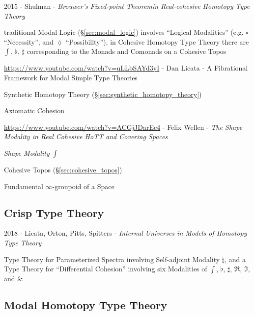 2015 - Shulman - \emph{Brouwer's Fixed-point Theoremin Real-cohesive Homotopy
  Type Theory}

traditional Modal Logic (\S\ref{sec:modal_logic}) involves ``Logical
Modalities'' (e.g. $\square$ ``Necessity'', and $\lozenge$ ``Possibility''), in
Cohesive Homotopy Type Theory there are $\int$, $\flat$, $\sharp$ corresponding
to the Monads and Comonads on a Cohesive Topos

\asterism

\url{https://www.youtube.com/watch?v=uLLbSAYd3yI} - Dan Licata - A Fibrational
Framework for Modal Simple Type Theories

\fist Synthetic Homotopy Theory (\S\ref{sec:synthetic_homotopy_theory})

Axiomatic Cohesion

\asterism

\url{https://www.youtube.com/watch?v=ACGjJDarEc4} - Felix Wellen - \emph{The
  Shape Modality in Real Cohesive HoTT and Covering Spaces}

\emph{Shape Modality} $\int$

Cohesive Topos (\S\ref{sec:cohesive_topos})

Fundamental $\infty$-groupoid of a Space



\subsection{Crisp Type Theory}\label{sec:crisp_type_theory}

2018 - Licata, Orton, Pitts, Spitters - \emph{Internal Universes in Models of
  Homotopy Type Theory}

Type Theory for Parameterized Spectra involving Self-adjoint Modality
$\natural$, and a Type Theory for ``Differential Cohesion'' involving six
Modalities of $\int$, $\flat$, $\sharp$, $\mathfrak{R}$, $\mathfrak{I}$, and
$\&$



\subsection{Modal Homotopy Type Theory}\label{sec:modal_hott}

